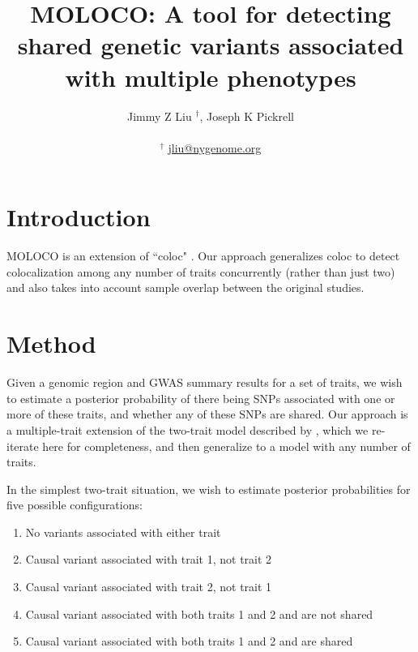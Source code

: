 \documentclass{article}
\begin{document}
\title{MOLOCO: A tool for detecting shared genetic variants associated with multiple phenotypes}

\author{Jimmy Z Liu $^{\dagger}$, Joseph K Pickrell\\ \\
\small $^\dagger$ \url{jliu@nygenome.org}
}
\maketitle


\section{Introduction}
MOLOCO is an extension of ``coloc" \citep{Giambartolomei:2014aa}. Our approach generalizes coloc to detect colocalization among any number of traits concurrently (rather than just two) and also takes into account sample overlap between the original studies.


\section{Method}

Given a genomic region and GWAS summary results for a set of traits, we wish to estimate a posterior probability of there being SNPs associated with one or more of these traits, and whether any of these SNPs are shared. Our approach is a multiple-trait extension of the two-trait model described by \cite{Giambartolomei:2014aa}, which we re-iterate here for completeness, and then generalize to a model with any number of traits.

In the simplest two-trait situation, we wish to estimate posterior probabilities for five possible configurations:
\begin{enumerate}[start=0]
  \item No variants associated with either trait
  \item Causal variant associated with trait 1, not trait 2
  \item Causal variant associated with trait 2, not trait 1
  \item Causal variant associated with both traits 1 and 2 and are not shared
  \item Causal variant associated with both traits 1 and 2 and are shared
\end{enumerate}
\end{document}
